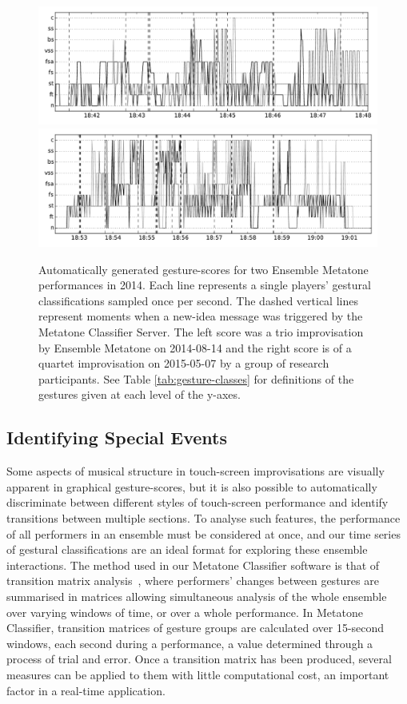 \documentclass[graybox]{svmult}
\begin{document}
\begin{figure}
\centering
\includegraphics[width=0.85\textheight,angle=90,origin=c]{figures/Performance-14-08-14-18_40-bw.pdf}
\includegraphics[width=0.85\textheight,angle=90,origin=c]{figures/gesture-score-15-05-07-18-52-bw.pdf}
\caption{Automatically generated gesture-scores for two Ensemble
  Metatone performances in 2014. Each line represents a
  single players' gestural classifications sampled once per second.
  The dashed vertical lines represent moments when a new-idea
  message was triggered by the Metatone Classifier Server. The left
  score was a trio improvisation by Ensemble Metatone on 2014-08-14
  and the right score is of a quartet improvisation on 2015-05-07 by a
  group of research participants. See Table \ref{tab:gesture-classes}
  for definitions of the gestures given at each level of the y-axes.}
\label{gesturescore}
\end{figure}

\subsection{Identifying Special Events}
\label{subsec:special-events}

Some aspects of musical structure in touch-screen improvisations are
visually apparent in graphical gesture-scores, but it is also possible
to automatically discriminate between different styles of touch-screen
performance and identify transitions between multiple sections. To
analyse such features, the performance of all performers in an
ensemble must be considered at once, and our time series of gestural
classifications are an ideal format for exploring these ensemble
interactions. The method used in our Metatone Classifier software is
that of transition matrix analysis~\cite{Swift:2014tya}, where
performers' changes between gestures are summarised in matrices
allowing simultaneous analysis of the whole ensemble over varying
windows of time, or over a whole performance. In Metatone Classifier,
transition matrices of gesture groups are calculated over 15-second
windows, each second during a performance, a value determined through
a process of trial and error. Once a transition matrix has been
produced, several measures can be applied to them with little
computational cost, an important factor in a real-time application.
\end{document}

